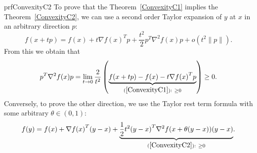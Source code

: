\begin{prf}{prfConvexityC2}
    To prove that the Theorem~\ref{ConvexityC1} implies the Theorem~\ref{ConvexityC2}, we can use a second order Taylor expansion of $y$ at $x$ in an arbitrary direction $p$:
    \begin{equation*}
        f(x + tp) = f(x) + t \nabla {f(x)}^T p + \frac{t^2}{2} p^T \nabla^2 f(x) p + o(t^2\|p\|).
    \end{equation*}
    From this we obtain that
    \begin{equation*}
        p^T \nabla^2 f(x) p = \lim_{t \rightarrow 0} \frac{2}{t^2} \left(\underset{(\ref*{ConvexityC1}): \ \geq 0}{\underbrace{f(x + tp) - f(x) - t \nabla {f(x)}^T p}}\right) \geq 0.
    \end{equation*}
    Conversely, to prove the other direction, we use the Taylor rest term formula with some arbitrary $\theta \in (0,1)$:
    \begin{equation*}
        f(y) = f(x) + \nabla {f(x)}^T(y-x) + \underset{(\ref*{ConvexityC2}): \ \geq 0}{\underbrace{\frac{1}{2}t^2 {(y-x)}^T \nabla^2 f(x + \theta(y-x)) (y-x)}}. 
    \end{equation*}
    \vspace{-0.7cm}
\end{prf}

